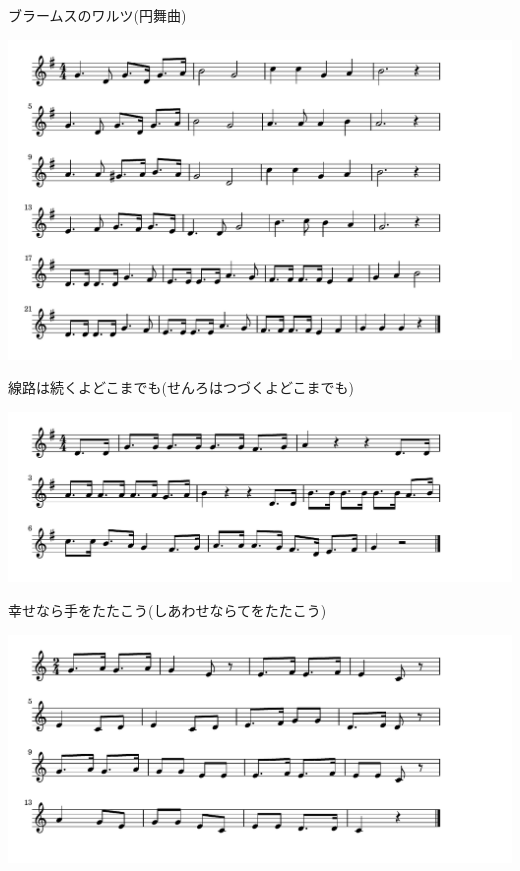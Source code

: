 \documentclass[a4paper]{ltjsarticle}
\begin{document}
\vspace{-10mm} \hspace{10mm}
ブラームスのワルツ(円舞曲)

\includegraphics[clip]{senrowa_crop.pdf}

\vspace{-10mm} \hspace{10mm}
線路は続くよどこまでも(せんろはつづくよどこまでも)

\includegraphics[clip]{shiawasenara_crop.pdf}

\vspace{-10mm} \hspace{10mm}
幸せなら手をたたこう(しあわせならてをたたこう)


\includegraphics[clip]{yukiyakonko_crop.pdf}
\end{document}

